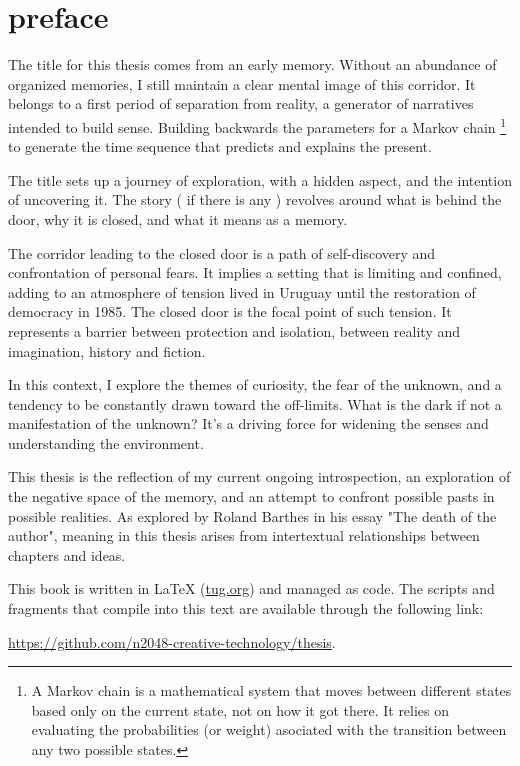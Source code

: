 \chapter*{preface}
\normalsize

\newpage  %
The title for this thesis comes from an early memory. Without an abundance of organized memories, I still maintain a clear mental image of this corridor. It belongs to a first period of separation from reality, a generator of narratives intended to build sense. Building backwards the parameters for a Markov chain \footnote{A Markov chain is a mathematical system that moves between different states based only on the current state, not on how it got there. It relies on evaluating the probabilities (or weight) asociated with the transition between any two possible states.} to generate the time sequence that predicts and explains the present.    

The title sets up a journey of exploration, with a hidden aspect, and the intention of uncovering it. The story ( if there is any ) {r}evolves around what is behind the door, why it is closed, and what it means as a memory.

The corridor leading to the closed door is a path of self-discovery and confrontation of personal fears. It implies a setting that is limiting and confined, adding to an atmosphere of tension lived in Uruguay until the restoration of democracy in 1985. The closed door is the focal point of such tension. It represents a barrier between protection and isolation, between reality and imagination, history and fiction.

In this context, I explore the themes of curiosity, the fear of the unknown, and a tendency to be constantly drawn toward the off-limits. What is the dark if not a manifestation of the unknown? It's a driving force for widening the senses and understanding the environment.

This thesis is the reflection of my current ongoing introspection, an exploration of the negative space of the memory, and an attempt to confront possible pasts in possible realities. As explored by Roland Barthes in his essay "The death of the author"\citep{barthes1967}, meaning in this thesis arises from intertextual relationships between chapters and ideas. 



This book is written in \LaTeX{} (\href{https://www.tug.org/texlive/quickinstall.html}{tug.org}) and managed as code. The scripts and fragments that compile into this text are available through the following link: 

\href{https://github.com/n2048-creative-technology/thesis}{https://github.com/n2048-creative-technology/thesis}.